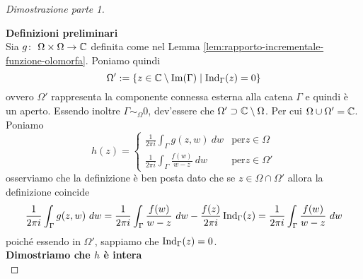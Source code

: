 \begin{proof}[Dimostrazione parte 1]\

    \textbf{Definizioni preliminari}\\

    Sia $g \colon\ \Omega\times\Omega \rightarrow \mathbb{C}$ definita come nel Lemma
    \ref{lem:rapporto-incrementale-funzione-olomorfa}. 
    Poniamo quindi 
    \begin{equation*}
        \Omega' := \left\{ z \in \mathbb{C} \setminus \operatorname{Im}(\Gamma) \mid
            \operatorname{Ind}_\Gamma(z) = 0  \right\}
    \end{equation*}
    ovvero $\Omega'$ rappresenta la componente connessa esterna alla catena
    $\Gamma$ e quindi è un aperto.
    Essendo inoltre $\Gamma \sim_\Omega 0$, dev'essere che $\Omega' \supset
    \mathbb{C} \setminus \Omega$.  Per cui $\Omega \cup \Omega' = \mathbb{C}$. Poniamo 
    \begin{equation*}
      h(z) = \begin{cases}
        \frac{1}{2\pi i} \int_\Gamma g(z,w)\ dw  & \text{per} z \in \Omega \\
        \frac{1}{2\pi i} \int_\Gamma \frac{f(w)}{w-z}\ dw \ & \text{per}
        z \in \Omega' 
      \end{cases}
    \end{equation*}
    osserviamo che la definizione è ben posta dato che se $z \in \Omega \cap
    \Omega'$ allora la definizione coincide
    \begin{equation*}
      \frac{1}{2\pi i} \int_\Gamma g(z,w)\ dw =  
            \frac{1}{2\pi i} \int_\Gamma \frac{f(w)}{w-z}\ dw - 
            \frac{f(z)}{2\pi i} \operatorname{Ind}_\Gamma(z) 
            = \frac{1}{2\pi i} \int_\Gamma \frac{f(w)}{w-z}\ dw        
    \end{equation*}
    poiché essendo in $\Omega'$, sappiamo che $\operatorname{Ind}_\Gamma(z)
    = 0$. \\
    
    \textbf{Dimostriamo che $h$ è intera}\\


\end{proof}
